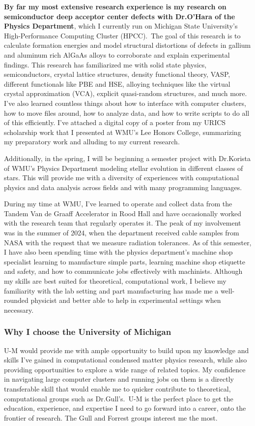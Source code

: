 \documentclass[11pt]{article}
\newcommand{\school}{University of Michigan}
\newcommand{\schoolabbr}{U-M}
\begin{document}
\textbf{By far my most extensive research experience is my research on semiconductor deep acceptor center defects with Dr.\@ O'Hara of the Physics Department}, which I currently run on Michigan State University's High-Performance Computing Cluster (HPCC).\ The goal of this research is to calculate formation energies and model structural distortions of defects in gallium and aluminum rich AlGaAs alloys to corroborate and explain experimental findings. This research has familiarized me with solid state physics, semiconductors, crystal lattice structures, density functional theory, VASP, different functionals like PBE and HSE, alloying techniques like the virtual crystal approximation (VCA), explicit quasi-random structures, and much more. I've also learned countless things about how to interface with computer clusters, how to move files around, how to analyze data, and how to write scripts to do all of this efficiently. I've attached a digital copy of a poster from my URICS scholarship work that I presented at WMU's Lee Honors College, summarizing my preparatory work and alluding to my current research.
\pagebreak

Additionally, in the spring, I will be beginning a semester project with Dr.\@ Korista of WMU's Physics Department modeling stellar evolution in different classes of stars. This will provide me with a diversity of experiences with computational physics and data analysis across fields and with many programming languages.

During my time at WMU, I've learned to operate and collect data from the Tandem Van de Graaff Accelerator in Rood Hall and have occasionally worked with the research team that regularly operates it. The peak of my involvement was in the summer of 2024, when the department received cable samples from NASA with the request that we measure radiation tolerances. As of this semester, I have also been spending time with the physics department's machine shop specialist learning to manufacture simple parts, learning machine shop etiquette and safety, and how to communicate jobs effectively with machinists. Although my skills are best suited for theoretical, computational work, I believe my familiarity with the lab setting and part manufacturing has made me a well-rounded physicist and better able to help in experimental settings when necessary.

\subsubsection*{Why I choose the \school{}}
\schoolabbr{} would provide me with ample opportunity to build upon my knowledge and skills I've gained in computational condensed matter physics research, while also providing opportunities to explore a wide range of related topics. My confidence in navigating large computer clusters and running jobs on them is a directly transferable skill that would enable me to quicker contribute to theoretical, computational groups such as Dr.\@ Gull's.\ \schoolabbr{} is the perfect place to get the education, experience, and expertise I need to go forward into a career, onto the frontier of research. The Gull and Forrest groups interest me the most.
\end{document}

